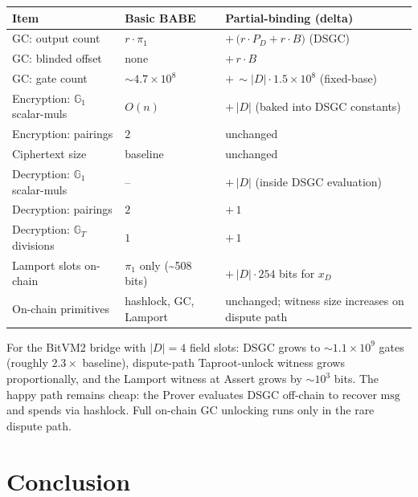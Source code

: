 \documentclass[11pt]{article}
\newcommand{\Gone}{\mathbb{G}_1}
\newcommand{\Gt}{\mathbb{G}_T}
\newcommand{\msg}{\mathrm{msg}}
\begin{document}
\begin{center}
\small
\renewcommand{\arraystretch}{1.2}
\begin{tabular}{@{}l l l@{}}
\toprule
\textbf{Item} & \textbf{Basic BABE} & \textbf{Partial-binding (delta)} \\
\midrule
GC: output count                        & $r \cdot \pi_1$             & $+\,\bigl(r \cdot P_D + r \cdot B\bigr)$ (DSGC) \\
GC: blinded offset                      & none                        & $+\,r \cdot B$ \\
GC: gate count                          & $\sim 4.7 \times 10^8$      & $+\,\sim |D| \cdot 1.5 \times 10^8$ (fixed-base) \\
Encryption: $\Gone$ scalar-muls         & $O(n)$                      & $+\,|D|$ (baked into DSGC constants) \\
Encryption: pairings                    & $2$                         & unchanged \\
Ciphertext size                         & baseline                    & unchanged \\
Decryption: $\Gone$ scalar-muls         & --                          & $+\,|D|$ (inside DSGC evaluation) \\
Decryption: pairings                    & $2$                         & $+\,1$ \\
Decryption: $\Gt$ divisions             & $1$                         & $+\,1$ \\
Lamport slots on-chain                  & $\pi_1$ only (\textasciitilde 508 bits) & $+\,|D| \cdot 254$ bits for $x_D$ \\
On-chain primitives                     & hashlock, GC, Lamport       & unchanged; witness size increases on dispute path \\
\bottomrule
\end{tabular}
\end{center}

For the BitVM2 bridge with $|D| = 4$ field slots: DSGC grows to
$\sim\!1.1 \times 10^9$ gates (roughly $2.3\times$ baseline),
dispute-path Taproot-unlock witness grows proportionally, and the
Lamport witness at Assert grows by $\sim\!10^3$ bits. The happy path
remains cheap: the Prover evaluates DSGC off-chain to recover $\msg$
and spends via hashlock. Full on-chain GC unlocking runs only in the
rare dispute path.

\section{Conclusion}
\end{document}

